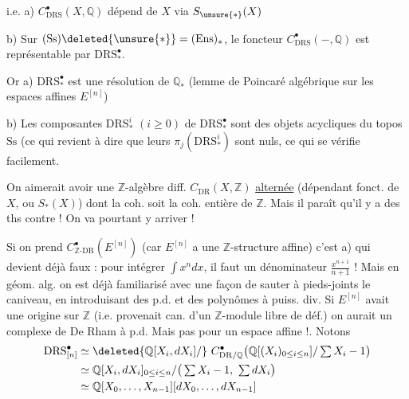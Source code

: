 i.e. \quad a) $C^\bullet_{\mathrm{DRS}}(X,\mathbb Q)$ dépend de $X$ via $S_{\unsure{\ast}}(X)$

b) Sur $(\mathrm{Ss})\deleted{\unsure{\ast}}=(\mathrm{Ens})_{\ast}$, le foncteur $C^\bullet_{\mathrm{DRS}}(-,\mathbb Q)$ est représentable par $\mathrm{DRS}^{\bullet}_{\ast}$.

Or \quad a) $\mathrm{DRS}^{\bullet}_{\ast}$ est une résolution de $\mathbb Q_{\ast}$  (lemme de Poincaré algébrique sur les espaces affines $E^{[n]}$)

b) Les composantes $\mathrm{DRS}^{i}_{\ast}$ $(i\geq 0)$ de $\mathrm{DRS}^{\bullet}_{\ast}$ sont des objets  acycliques du topos $\mathrm{Ss}$ (ce qui revient à dire que leurs $\pi_j(\mathrm{DRS}^{i}_{\ast})$ sont nuls, ce qui se vérifie facilement. 

 On aimerait avoir une $\mathbb Z$-algèbre diff. $C_{\mathrm{DR}}(X,\mathbb Z)$ \uline{alternée} (dépendant fonct. de $X$, ou $S_{\ast}(X)$) dont la coh. soit la coh. entière de $\mathbb Z$. Mais il paraît qu'il y a des ths contre ! On va pourtant y arriver  !

Si on prend $C_{\mathbb Z\text{-}\mathrm{DR}}^{\bullet}(E^{[n]})$ (car $E^{[n]}$ a une $\mathbb Z$-structure affine) c'est a) qui devient déjà faux : pour intégrer $\int x^n dx$, il faut un dénominateur  $\frac{x^{n+1}}{n+1}$ ! Mais en géom. alg. on est déjà familiarisé avec une façon de sauter à pieds-joints  le caniveau, en introduisant des p.d. et des polynômes  à puiss. div. Si $E^{[n]}$ avait une origine sur $\mathbb Z$ (i.e. provenait can. d'un $\mathbb Z$-module libre de déf.) on aurait un complexe de De Rham à p.d. Mais pas pour un espace affine !. Notons
\[
\begin{aligned}
\mathrm{DRS}^{\bullet}_{[n]}&\simeq\deleted{\mathbb Q[X_i,dX_i]/}\ C^\bullet_{\mathrm{DR}/\mathbb Q}\big(\mathbb Q[(X_i)_{0\leq i\leq n}]/\textstyle\sum X_i-1\big)\\
&\simeq\mathbb Q[X_i,dX_i]_{0\leq i\leq n}/\big(\textstyle\sum X_i-1,\ \textstyle\sum dX_i\big)\\
&\simeq\mathbb Q[X_0,\ldots,X_{n-1}][dX_0,\ldots,dX_{n-1}]
\end{aligned}
\]

